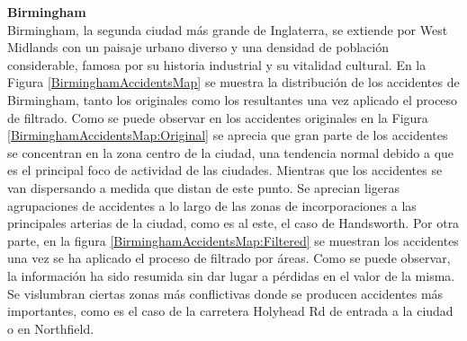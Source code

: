 \textbf{Birmingham}\\

Birmingham, la segunda ciudad más grande de Inglaterra, se extiende por West Midlands con un paisaje urbano diverso y una densidad de población considerable, famosa por su historia industrial y su vitalidad cultural. En la Figura \ref{BirminghamAccidentsMap} se muestra la distribución de los accidentes de Birmingham, tanto los originales como los resultantes una vez aplicado el proceso de filtrado. Como se puede observar en los accidentes originales en la Figura \ref{BirminghamAccidentsMap:Original} se aprecia que gran parte de los accidentes se concentran en la zona centro de la ciudad, una  tendencia normal debido a que es el principal foco de actividad de las ciudades. Mientras que los accidentes se van dispersando a medida que distan de este punto. Se aprecian ligeras agrupaciones de accidentes a lo largo de las zonas de incorporaciones a las principales arterias de la ciudad, como es al este, el caso de Handsworth. Por otra parte, en la figura \ref{BirminghamAccidentsMap:Filtered} se muestran los accidentes una vez se ha aplicado el proceso de filtrado por áreas. Como se puede observar, la información ha sido resumida sin dar lugar a pérdidas en el valor de la misma. Se vislumbran ciertas zonas más conflictivas donde se producen accidentes más importantes, como es el caso de la carretera Holyhead Rd de entrada a la ciudad o en Northfield.


